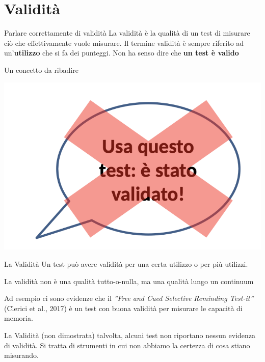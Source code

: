 \documentclass[
  ignorenonframetext,
]{beamer}
\begin{document}
\section{Validità}\label{validituxe0}

\begin{frame}{Parlare correttamente di validità}
\label{parlare-correttamente-di-validituxe0}
La validità è la qualità di un test di misurare ciò che effettivamente
vuole misurare. Il termine validità è sempre riferito ad
un'\textbf{utilizzo} che si fa dei punteggi. \vfill \pause Non ha senso
dire che \textbf{un test è valido} \vfill \pause

\begin{center}
\end{center}
\end{frame}

\begin{frame}{Un concetto da ribadire}
\label{un-concetto-da-ribadire}
\begin{center}
\includegraphics[width=0.5\linewidth,height=\textheight,keepaspectratio]{Figures/Usa_questo_test.png}
\end{center}
\end{frame}

\begin{frame}{La Validità}
\label{la-validituxe0}
Un test può avere validità per una certa utilizzo o per più utilizzi.

La validità non è una qualità tutto-o-nulla, ma una qualità lungo un
continuum

Ad esempio ci sono evidenze che il \emph{''Free and Cued Selective
Reminding Test-it''} (Clerici et al., 2017) è un test con buona validità
per misurare le capacità di memoria.
\end{frame}

\begin{frame}{La Validità (non dimostrata)}
\label{la-validituxe0-non-dimostrata}
talvolta, alcuni test non riportano nessun evidenza di validità. Si
tratta di strumenti in cui non abbiamo la certezza di cosa stiano
misurando.
\end{frame}
\end{document}
